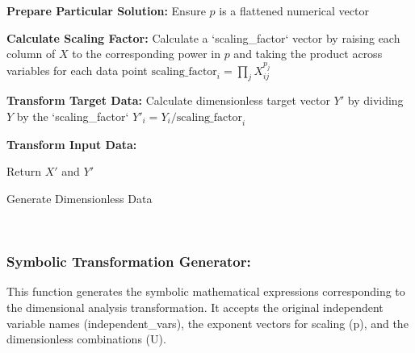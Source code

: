 \documentclass{article}
\begin{document}
\begin{algorithm}[H]
\SetAlgoLined
{}

\textbf{Prepare Particular Solution:}\;
Ensure \(p\) is a flattened numerical vector\;

\textbf{Calculate Scaling Factor:}\;
Calculate a `scaling_factor` vector by raising each column of \(X\) to the corresponding power in \(p\) and taking the product across variables for each data point\;
\( \text{scaling\_factor}_i = \prod_{j} X_{ij}^{p_j} \)\;

\textbf{Transform Target Data:}\;
Calculate dimensionless target vector \(Y'\) by dividing \(Y\) by the `scaling_factor`\;
\( Y'_i = Y_i / \text{scaling\_factor}_i \)\;

\textbf{Transform Input Data:}\;

Return \(X'\) and \(Y'\)\;

\caption{Generate Dimensionless Data}
\label{alg:generate_dimensionless_data} %
\end{algorithm}\\






\subsubsection{Symbolic Transformation Generator: }

This function generates the symbolic mathematical expressions corresponding to the dimensional analysis transformation. It accepts the original independent variable names (independent\_vars), the exponent vectors for scaling (p), and the dimensionless combinations (U).\\
\end{document}
